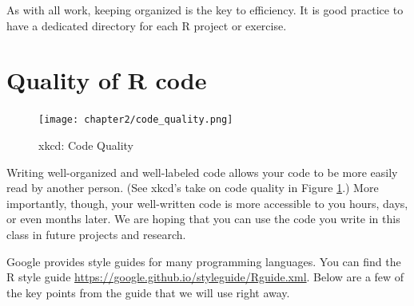 As with all work, keeping organized is the key to efficiency. It is good practice to have a dedicated directory for each R project or exercise. 



\section{Quality of R code}

\begin{figure}[htbp]
\texttt{[image: chapter2/code\_quality.png]}
\caption{xkcd: Code Quality}
\label{FIG:COMIC}
\end{figure}

Writing well-organized and well-labeled code allows your code to be more easily read by another person. (See xkcd's take on code quality in Figure \ref{FIG:COMIC}.) More importantly, though, your well-written code is more accessible to you hours, days, or even months later. We are hoping that you can use the code you write in this class in future projects and research.

Google provides style guides for many programming languages. You can find the R style guide \href{here}{https://google.github.io/styleguide/Rguide.xml}. Below are a few of the key points from the guide that we will use right away.


